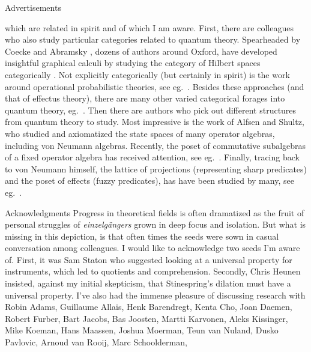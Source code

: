 \documentclass[b]{subfiles}
\begin{document}
\begin{parsec}
\begin{point}{Advertisements}
\begin{point}
        which are related in spirit and of which I am aware.
First, there are colleagues who also study particular categories
    related to quantum theory.
Spearheaded by Coecke and Abramsky \cite{abramsky2004categorical},
    dozens of authors around Oxford,
    have developed insightful graphical calculi
    by studying the category of Hilbert spaces
    categorically \cite{coecke2017picturing}.
Not explicitly categorically (but certainly in spirit)
    is the work around operational probabilistic theories,
    see eg.~\cite{DAriano2016}.
Besides these approaches (and that of effectus theory),
    there are many other varied categorical forages
    into quantum theory, eg.~\cite{kornell2012,rennela2017infinite,staton,furber2013kleisli}.
Then there are authors who pick out different structures from quantum theory
    to study.
Most impressive is the work of Alfsen and Shultz,
    who studied and axiomatized the state
    spaces of many operator algebras, including von Neumann algebras. \cite{alfsen2012}
Recently, the poset of commutative subalgebras of a fixed operator algebra
    has received attention,
    see eg.~\cite{heunen2015domains,bert,heunen2012bohrification}.
Finally,
    tracing back to von Neumann himself,
    the lattice of projections (representing sharp predicates)
    and the poset of effects (fuzzy predicates),
    has have been studied by many, see eg.~\cite{dvurecenskij2013new}.
\end{point}
\end{point}
\begin{point}{Acknowledgments}%
Progress in theoretical fields
    is often dramatized
    as the fruit of personal struggles of  \emph{einzelg\"angers}
    grown in deep focus and isolation.
But what is missing in this depiction, is that
    often times  the seeds were sown
    in casual conversation among colleagues.
I would like to acknowledge two seeds I'm aware of.
First, it was Sam Staton who suggested looking at a universal property
    for instruments, which led to quotients and comprehension.
Secondly, Chris Heunen insisted,
    against my initial skepticism,
    that Stinespring's dilation must have a
    universal property.
I've also had the immense pleasure of discussing research with
    Robin Adams,
    Guillaume Allais,
    Henk Barendregt,
    Kenta Cho,
    Joan Daemen,
    Robert Furber,
    Bart Jacobs,
    Bas Joosten,
    Martti Karvonen,
    Aleks Kissinger,
    Mike Koeman,
    Hans Maassen,
    Joshua Moerman,
    Teun van Nuland,
    Dusko Pavlovic,
    Arnoud van Rooij,
    Marc Schoolderman,

\end{point}
\end{parsec}
\end{document}

